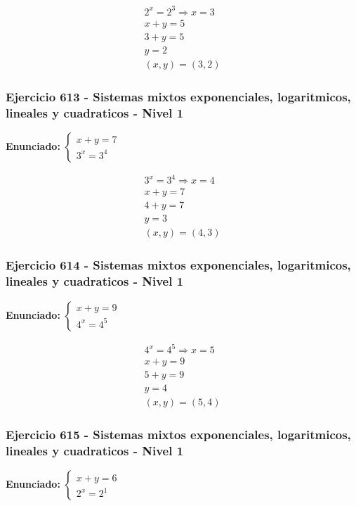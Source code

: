 \documentclass[12pt,a4paper]{article}
\begin{document}
\[
\begin{aligned}
2^x=2^{3}\Rightarrow x=3\\
x+y=5\\
3+y=5\\
y=2\\
\boxed{(x,y)=(3,2)}
\end{aligned}
\]


\subsubsection*{Ejercicio 613 - Sistemas mixtos exponenciales, logaritmicos, lineales y cuadraticos - Nivel 1}
\textbf{Enunciado:} \(\begin{cases} x+y=7\\ 3^x=3^{4}\end{cases}\)

\[
\begin{aligned}
3^x=3^{4}\Rightarrow x=4\\
x+y=7\\
4+y=7\\
y=3\\
\boxed{(x,y)=(4,3)}
\end{aligned}
\]


\subsubsection*{Ejercicio 614 - Sistemas mixtos exponenciales, logaritmicos, lineales y cuadraticos - Nivel 1}
\textbf{Enunciado:} \(\begin{cases} x+y=9\\ 4^x=4^{5}\end{cases}\)

\[
\begin{aligned}
4^x=4^{5}\Rightarrow x=5\\
x+y=9\\
5+y=9\\
y=4\\
\boxed{(x,y)=(5,4)}
\end{aligned}
\]


\subsubsection*{Ejercicio 615 - Sistemas mixtos exponenciales, logaritmicos, lineales y cuadraticos - Nivel 1}
\textbf{Enunciado:} \(\begin{cases} x+y=6\\ 2^x=2^{1}\end{cases}\)
\end{document}
